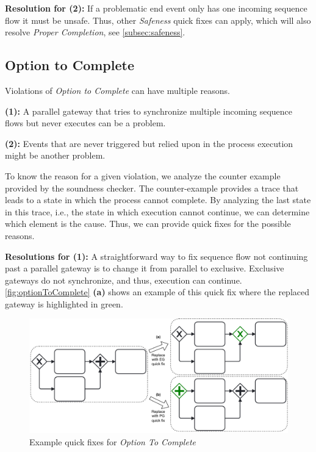 \documentclass[runningheads]{llncs}
\begin{document}
\textbf{Resolution for (2):} If a problematic end event only has one incoming sequence flow it must be unsafe.
Thus, other \textit{Safeness} quick fixes can apply, which will also resolve \textit{Proper Completion}, see \autoref{subsec:safeness}.


\subsection{Option to Complete} \label{subsec:optionToComplete}
Violations of \textit{Option to Complete} can have multiple reasons.

\textbf{(1):} A parallel gateway that tries to synchronize multiple incoming sequence flows but never executes can be a problem.

\textbf{(2):} Events that are never triggered but relied upon in the process execution might be another problem.

To know the reason for a given violation, we analyze the counter example provided by the soundness checker.
The counter-example provides a trace that leads to a state in which the process cannot complete.
By analyzing the last state in this trace, i.e., the state in which execution cannot continue, we can determine which element is the cause.
Thus, we can provide quick fixes for the possible reasons.

\textbf{Resolutions for (1):} A straightforward way to fix sequence flow not continuing past a parallel gateway is to change it from parallel to exclusive.
Exclusive gateways do not synchronize, and thus, execution can continue.
\autoref{fig:optionToComplete} \textbf{(a)} shows an example of this quick fix where the replaced gateway is highlighted in green.

\begin{figure}[ht]
	\centering
	\includegraphics[width=1\textwidth]{images/optionToComplete}
	\caption{Example quick fixes for \textit{Option To Complete}}
	\label{fig:optionToComplete}
\end{figure}
\end{document}
